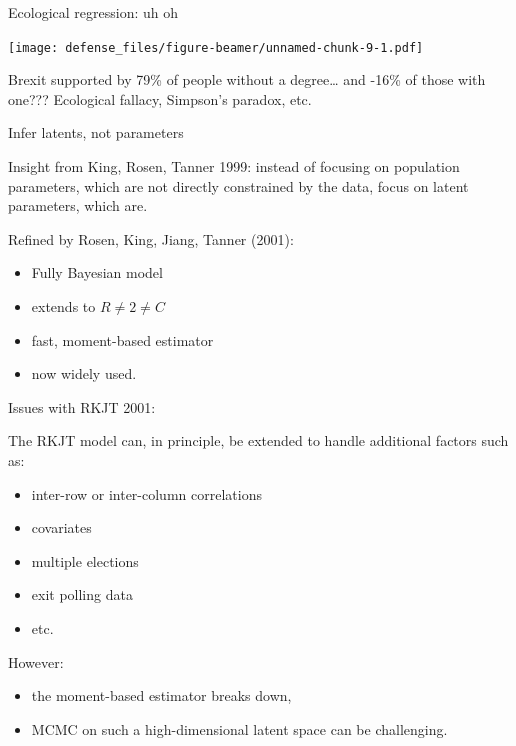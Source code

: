 \documentclass[ignorenonframetext,]{beamer}
\providecommand{\tightlist}{%
\setlength{\itemsep}{0pt}\setlength{\parskip}{0pt}}
\begin{document}
\begin{frame}{Ecological regression: uh oh}

\texttt{[image: defense\_files/figure-beamer/unnamed-chunk-9-1.pdf]}

Brexit supported by 79\% of people without a degree\ldots{} and -16\% of
those with one??? Ecological fallacy, Simpson's paradox, etc.

\end{frame}

\begin{frame}{Infer latents, not parameters}

Insight from King, Rosen, Tanner 1999: instead of focusing on population
parameters, which are not directly constrained by the data, focus on
latent parameters, which are.

Refined by Rosen, King, Jiang, Tanner (2001):

\begin{itemize}
\item
  Fully Bayesian model
\item
  extends to \(R\neq 2 \neq C\)
\item
  fast, moment-based estimator
\item
  now widely used.
\end{itemize}

\end{frame}

\begin{frame}{Issues with RKJT 2001:}

The RKJT model can, in principle, be extended to handle additional
factors such as:

\begin{itemize}
\tightlist
\item
  inter-row or inter-column correlations
\item
  covariates
\item
  multiple elections
\item
  exit polling data
\item
  etc.
\end{itemize}

However:

\begin{itemize}
\tightlist
\item
  the moment-based estimator breaks down,
\item
  MCMC on such a high-dimensional latent space can be challenging.
\end{itemize}

\end{frame}
\end{document}
